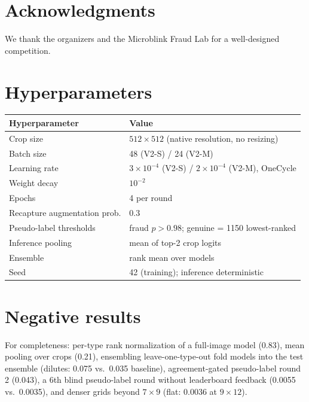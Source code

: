 \documentclass[11pt,a4paper]{article}
\begin{document}
\section*{Acknowledgments}
We thank the organizers and the Microblink Fraud Lab for a well-designed competition.




\appendix
\section{Hyperparameters}
\label{app:hparams}
\begin{table}[h]
  \centering
  \small
  \begin{tabular}{ll}
    \toprule
    Hyperparameter & Value \\
    \midrule
    Crop size & $512\times512$ (native resolution, no resizing) \\
    Batch size & 48 (V2-S) / 24 (V2-M) \\
    Learning rate & $3\times10^{-4}$ (V2-S) / $2\times10^{-4}$ (V2-M), OneCycle \\
    Weight decay & $10^{-2}$ \\
    Epochs & 4 per round \\
    Recapture augmentation prob. & 0.3 \\
    Pseudo-label thresholds & fraud $p>0.98$; genuine = 1150 lowest-ranked \\
    Inference pooling & mean of top-2 crop logits \\
    Ensemble & rank mean over models \\
    Seed & 42 (training); inference deterministic \\
    \bottomrule
  \end{tabular}
\end{table}

\section{Negative results}
For completeness: per-type rank normalization of a full-image model (0.83), mean
pooling over crops (0.21), ensembling leave-one-type-out fold models into the test
ensemble (dilutes: 0.075 vs.\ 0.035 baseline), agreement-gated pseudo-label round 2
(0.043), a 6th blind pseudo-label round without leaderboard feedback (0.0055 vs.\
0.0035), and denser grids beyond $7{\times}9$ (flat: 0.0036 at $9{\times}12$).
\end{document}
